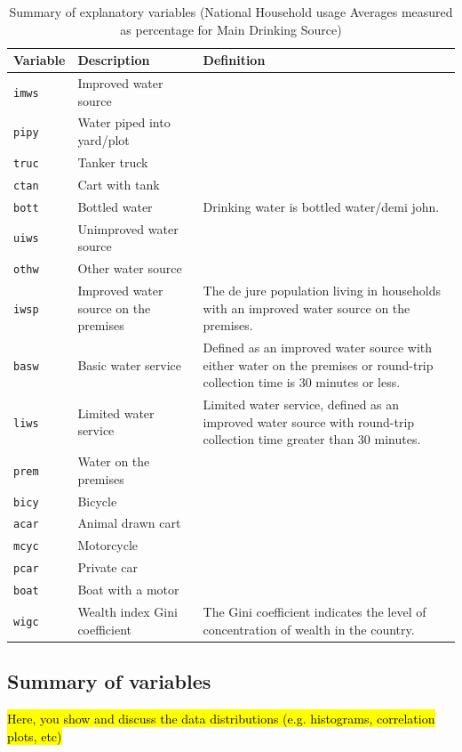\documentclass[10pt,twoside]{article}
\numberwithin{equation}{section}
\newcommand{\?}{\stackrel{?}{=}}
\begin{document}
\begin{table}[h!]
  \centering
  \begin{tabular}{p{1in} p{3in} p{2in}}\toprule
    \bf Variable & \bf Description & \bf Definition \\\midrule
    \texttt{imws} & Improved water source
 & 
 \\\midrule
  \texttt{pipy} & Water piped into yard/plot
&
\\\midrule
 \texttt{truc} & Tanker truck & 
\\\midrule
 \texttt{ctan} & Cart with tank & 
\\\midrule
 \texttt{bott} & Bottled water & Drinking water is bottled water/demi john.
\\\midrule
 \texttt{uiws} & Unimproved water source & 
\\\midrule
 \texttt{othw} & Other water source & 
\\\midrule
 \texttt{iwsp} & Improved water source on the premises & The de jure population living in households with an improved water source on the premises.
\\\midrule
 \texttt{basw} & Basic water service
 & Defined as an improved water source with either water on the premises or round-trip collection time is 30 minutes or less.
\\\midrule
 \texttt{liws} & Limited water service
 & Limited water service, defined as an improved water source with round-trip collection time greater than 30 minutes.
\\\midrule
 \texttt{prem} & Water on the premises
 & 
\\\midrule
 \texttt{bicy} & Bicycle
 &
\\\midrule
 \texttt{acar} & Animal drawn cart
 & 
\\\midrule
 \texttt{mcyc} & Motorcycle
 & 
\\\midrule
 \texttt{pcar} & Private car
 & 
\\\midrule
 \texttt{boat} & Boat with a motor
 & 
\\\midrule
 \texttt{wigc} & Wealth index Gini coefficient
 & The Gini coefficient indicates the level of concentration of wealth in the country.
  \\\bottomrule
  \end{tabular}
  \caption{Summary of explanatory variables (National Household usage Averages measured as percentage for Main Drinking Source)}
  \label{tab:summary-var}
\end{table}
 \subsection*{Summary of variables}
\hl{Here, you show and discuss the data distributions (e.g. histograms, correlation plots, etc)}
\end{document}
